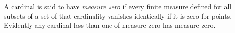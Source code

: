 A cardinal is said to have \textit{measure zero} if every finite measure defined for all subsets of a set of that cardinality vanishes identically if it is zero for points. Evidently any cardinal less than one of measure zero has measure zero.
